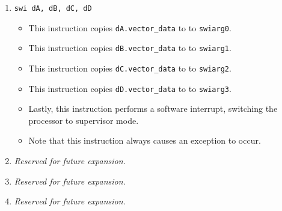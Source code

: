 \documentclass{article}
\begin{document}
\begin{itemize}
\begin{enumerate}
			\item \texttt{swi dA, dB, dC, dD}
				\begin{itemize}
				\item This instruction copies \texttt{dA.vector\_data} to
					to \texttt{swiarg0}.
				\item This instruction copies \texttt{dB.vector\_data} to
					to \texttt{swiarg1}.
				\item This instruction copies \texttt{dC.vector\_data} to
					to \texttt{swiarg2}.
				\item This instruction copies \texttt{dD.vector\_data} to
					to \texttt{swiarg3}.
				\item Lastly, this instruction performs a software
					interrupt, switching the processor to supervisor mode.
				\item Note that this instruction always causes an exception
					to occur.
				\end{itemize}
			\item \textit{Reserved for future expansion.}
			\item \textit{Reserved for future expansion.}
			\item \textit{Reserved for future expansion.}
			\end{enumerate}
		\end{itemize}
		\newpage
\end{document}
